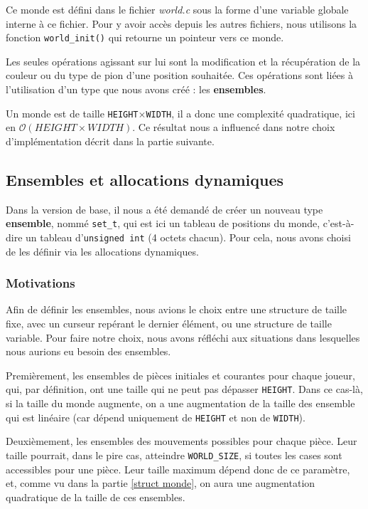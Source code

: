 \documentclass[a4paper]{article}
\begin{document}
Ce monde est défini dans le fichier \emph{world.c} sous la forme d'une variable globale interne à ce fichier. Pour y avoir accès depuis les autres fichiers, nous utilisons la fonction \verb|world_init()| qui retourne un pointeur vers ce monde.

Les seules opérations agissant sur lui sont la modification et la récupération de la couleur ou du type de pion d'une position souhaitée. Ces opérations sont liées à l'utilisation d'un type que nous avons créé : les \textbf{ensembles}.

Un monde est de taille \verb|HEIGHT|$\times$\verb|WIDTH|, il a donc une complexité quadratique, ici en $\mathcal{O}(HEIGHT\times WIDTH)$. Ce résultat nous a influencé dans notre choix d'implémentation décrit dans la partie suivante.

\subsection{Ensembles et allocations dynamiques}
\label{malloc}

Dans la version de base, il nous a été demandé de créer un nouveau type \textbf{ensemble}, nommé \verb|set_t|, qui est ici un tableau de positions du monde, c'est-à-dire un tableau d'\verb|unsigned int| (4 octets chacun). Pour cela, nous avons choisi de les définir via les allocations dynamiques.

\subsubsection{Motivations}
\label{motiv malloc}

Afin de définir les ensembles, nous avions le choix entre une structure de taille fixe, avec un curseur repérant le dernier élément, ou une structure de taille variable. Pour faire notre choix, nous avons réfléchi aux situations dans lesquelles nous aurions eu besoin des ensembles.

Premièrement, les ensembles de pièces initiales et courantes pour chaque joueur, qui, par définition, ont une taille qui ne peut pas dépasser \verb|HEIGHT|. Dans ce cas-là, si la taille du monde augmente, on a une augmentation de la taille des ensemble qui est linéaire (car dépend uniquement de \verb|HEIGHT| et non de \verb|WIDTH|).

Deuxièmement, les ensembles des mouvements possibles pour chaque pièce. Leur taille pourrait, dans le pire cas, atteindre \verb|WORLD_SIZE|, si toutes les cases sont accessibles pour une pièce. Leur taille maximum dépend donc de ce paramètre, et, comme vu dans la partie \ref{struct monde}, on aura une augmentation quadratique de la taille de ces ensembles.
\end{document}
